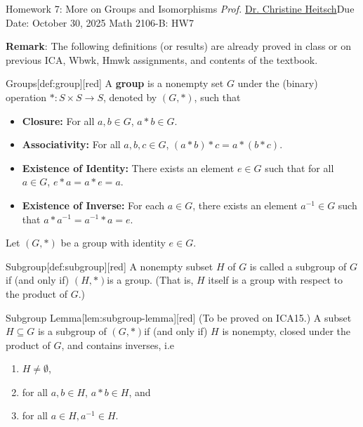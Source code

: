 \newpage{}
{Homework 7: More on Groups and Isomorphisms}
{\textit{Prof.} \href{https://ceheitsch.github.io/webpage/}{Dr. Christine Heitsch}}{Due Date: October 30, 2025}
{Math 2106-B: HW7}


\newpage
\textbf{Remark}: The following definitions (or results) are already proved in class or on previous ICA, 
Wbwk, Hmwk assignments, and contents of the textbook.
\begin{define}{Groups}[def:group][red]
  A \textbf{group} is a nonempty set \(G\) under the (binary) 
  operation \(*: S \times S \to S\), denoted by \((G, *)\), such that
  \begin{itemize}
    \item \textbf{Closure:} For all \(a, b \in G\), \(a * b \in G\).
    \item \textbf{Associativity:} For all \(a, b, c \in G\), \((a * b) * c = a * (b * c)\).
    \item \textbf{Existence of Identity:} There exists an element \(e \in G\) 
    such that for all \(a \in G\), \(e * a = a * e = a\).
    \item \textbf{Existence of Inverse:} For each \(a \in G\), there exists an 
    element \(a^{-1} \in G\) such that \(a * a^{-1} = a^{-1} * a = e\).
  \end{itemize}
\end{define}
Let $(G, *)$ be a group with identity $e \in G$.
\begin{define}{Subgroup}[def:subgroup][red]
  A nonempty subset $H$ of $G$ is called a subgroup of $G$ if (and only if) $(H, *)$is a group. (That is, $H$ itself is a group with respect to the product of $G$.)
\end{define}
\begin{define}{Subgroup Lemma}[lem:subgroup-lemma][red]
  (To be proved on ICA15.) A subset $H \subseteq G$ is a subgroup of $(G, *)$if (and only if) 
  $H$ is nonempty, closed under the product of $G$, and contains inverses, i.e 
  \begin{enumerate}
    \item $H \neq \emptyset$,
    \item for all $a, b \in H$, $a * b \in H$, and
    \item for all $a \in H, a^{-1} \in H$.
  \end{enumerate}
\end{define}
